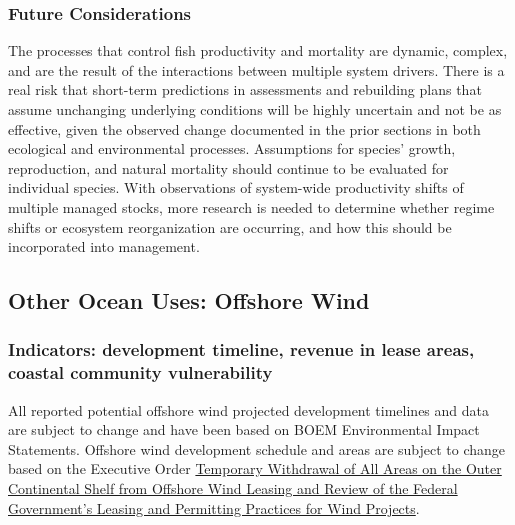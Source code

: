 \documentclass[
  10pt,
]{article}
\begin{document}
\hypertarget{future-considerations-2}{%
\subsubsection{Future Considerations}\label{future-considerations-2}}

The processes that control fish productivity and mortality are dynamic, complex, and are the result of the interactions between multiple system drivers. There is a real risk that short-term predictions in assessments and rebuilding plans that assume unchanging underlying conditions will be highly uncertain and not be as effective, given the observed change documented in the prior sections in both ecological and environmental processes. Assumptions for species' growth, reproduction, and natural mortality should continue to be evaluated for individual species. With observations of system-wide productivity shifts of multiple managed stocks, more research is needed to determine whether regime shifts or ecosystem reorganization are occurring, and how this should be incorporated into management.

\hypertarget{other-ocean-uses-offshore-wind}{%
\subsection{Other Ocean Uses: Offshore Wind}\label{other-ocean-uses-offshore-wind}}

\hypertarget{indicators-development-timeline-revenue-in-lease-areas-coastal-community-vulnerability}{%
\subsubsection{Indicators: development timeline, revenue in lease areas, coastal community vulnerability}\label{indicators-development-timeline-revenue-in-lease-areas-coastal-community-vulnerability}}

All reported potential offshore wind projected development timelines and data are subject to change and have been based on BOEM Environmental Impact Statements. Offshore wind development schedule and areas are subject to change based on the Executive Order \href{https://www.whitehouse.gov/presidential-actions/2025/01/temporary-withdrawal-of-all-areas-on-the-outer-continental-shelf-from-offshore-wind-leasing-and-review-of-the-federal-governments-leasing-and-permitting-practices-for-wind-projects/}{Temporary Withdrawal of All Areas on the Outer Continental Shelf from Offshore Wind Leasing and Review of the Federal Government's Leasing and Permitting Practices for Wind Projects}.
\end{document}
